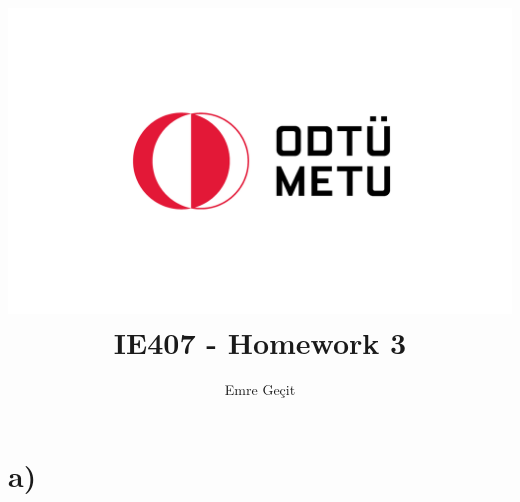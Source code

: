 \documentclass{article}
\author{Emre Geçit}
\title{\includegraphics{9.4.png}\\ IE407 - Homework 3}
\begin{document}
\maketitle

\newpage

\section*{a)}
\end{document}
